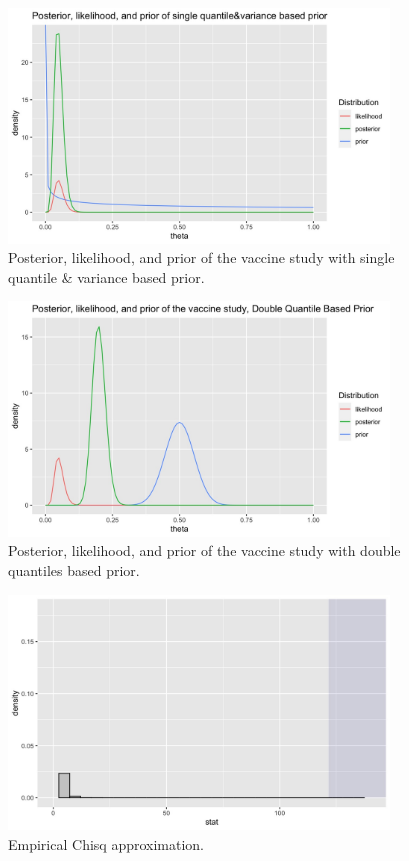 \documentclass[12pt]{amsart}
\begin{document}
\begin{figure}[H]
    \centering
    \includegraphics[width = 0.9\textwidth]{quantile approach.jpeg}
    \caption{\footnotesize{Posterior, likelihood, and prior of the vaccine study with single quantile \& variance based prior.}}
    \label{fig: quantile}
\end{figure}
\begin{figure}[H]
    \centering
    \includegraphics[width = 0.9\textwidth]{strongly informative.jpeg}
    \caption{\footnotesize{Posterior, likelihood, and prior of the vaccine study with double quantiles based prior.}}
    \label{fig: strong}
\end{figure}
\begin{figure}[H]
    \centering
    \includegraphics[width = 0.9\textwidth]{EmpiricalPVal.jpeg}
    \caption{\footnotesize{Empirical Chisq approximation.}}
    \label{fig: EmpPVal}
\end{figure}
\end{document}
